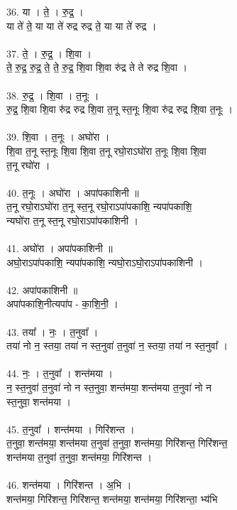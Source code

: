 36. या । ते॒ । रु॒द्र॒ ।\\
या ते॑ ते॒ या या ते॑ रुद्र रुद्र ते॒ या या ते॑ रुद्र ।\\
\\
37. ते॒ । रु॒द्र॒ । शि॒वा ।\\
ते॒ रु॒द्र॒ रु॒द्र॒ ते॒ ते॒ रु॒द्र॒ शि॒वा शि॒वा रु॑द्र ते ते रुद्र शि॒वा ।\\
\\
38. रु॒द्र॒ । शि॒वा । त॒नूः ।\\
रु॒द्र॒ शि॒वा शि॒वा रु॑द्र रुद्र शि॒वा त॒नू स्त॒नूः शि॒वा रु॑द्र रुद्र शि॒वा त॒नूः ।\\
\\
39. शि॒वा । त॒नूः । अघो॑रा ।\\
शि॒वा त॒नू स्त॒नूः शि॒वा शि॒वा त॒नू रघो॒राऽघो॑रा त॒नूः शि॒वा शि॒वा\\
त॒नू रघो॑रा ।\\
\\
40. त॒नूः । अघो॑रा । अपा॑पकाशिनी ॥\\
त॒नू रघो॒राऽघो॑रा त॒नू स्त॒नू रघो॒राऽपा॑पकाशि॒ न्यपा॑पकाशि॒\\
न्यघो॑रा त॒नू स्त॒नू रघो॒राऽपा॑पकाशिनी ।\\
\\
41. अघो॑रा । अपा॑पकाशिनी ॥\\
अघो॒राऽपा॑पकाशि॒ न्यपा॑पकाशि॒ न्यघो॒राऽघो॒राऽपा॑पकाशिनी ।\\
\\
42. अपा॑पकाशिनी ॥\\
अपा॑पकाशि॒नीत्यपा॑प - का॒शि॒नी॒ ।\\
\\
43. तया᳚ । नः॒ । त॒नुवा᳚ ।\\
तया॑ नो न॒ स्तया॒ तया॑ न स्त॒नुवा॑ त॒नुवा॑ न॒ स्तया॒ तया॑ न स्त॒नुवा᳚ ।\\
\\
44. नः॒ । त॒नुवा᳚ । शन्त॑मया ।\\
न॒ स्त॒नुवा॑ त॒नुवा॑ नो न स्त॒नुवा॒ शन्त॑मया॒ शन्त॑मया त॒नुवा॑ नो न\\
स्त॒नुवा॒ शन्त॑मया ।\\
\\
45. त॒नुवा᳚ । शन्त॑मया । गिरि॑शन्त ।\\
त॒नुवा॒ शन्त॑मया॒ शन्त॑मया त॒नुवा॑ त॒नुवा॒ शन्त॑मया॒ गिरि॑शन्त॒ गिरि॑शन्त॒\\
शन्त॑मया त॒नुवा॑ त॒नुवा॒ शन्त॑मया॒ गिरि॑शन्त ।\\
\\
46. शन्त॑मया । गिरि॑शन्त । अ॒भि ।\\
शन्त॑मया॒ गिरि॑शन्त॒ गिरि॑शन्त॒ शन्त॑मया॒ शन्त॑मया॒ गिरि॑शन्ता॒ भ्य॑भि\\

